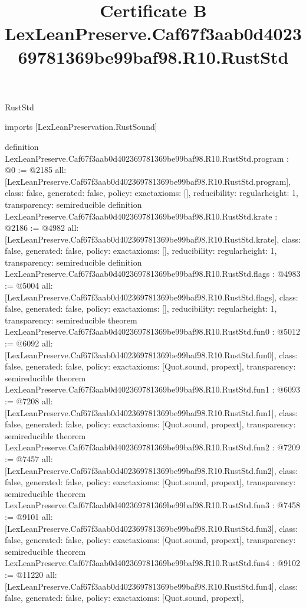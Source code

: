 \begin{lexlean}{RustStd}
\title{Certificate B LexLeanPreserve.Caf67f3aab0d402369781369be99baf98.R10.RustStd}
\begin{coremodule}
imports [LexLeanPreservation.RustSound]

definition LexLeanPreserve.Caf67f3aab0d402369781369be99baf98.R10.RustStd.program : @0 := @2185 {
  all: [LexLeanPreserve.Caf67f3aab0d402369781369be99baf98.R10.RustStd.program],
  class: false,
  generated: false,
  policy: exact{axioms: []},
  reducibility: regular{height: 1},
  transparency: semireducible
}
definition LexLeanPreserve.Caf67f3aab0d402369781369be99baf98.R10.RustStd.krate : @2186 := @4982 {
  all: [LexLeanPreserve.Caf67f3aab0d402369781369be99baf98.R10.RustStd.krate],
  class: false,
  generated: false,
  policy: exact{axioms: []},
  reducibility: regular{height: 1},
  transparency: semireducible
}
definition LexLeanPreserve.Caf67f3aab0d402369781369be99baf98.R10.RustStd.flags : @4983 := @5004 {
  all: [LexLeanPreserve.Caf67f3aab0d402369781369be99baf98.R10.RustStd.flags],
  class: false,
  generated: false,
  policy: exact{axioms: []},
  reducibility: regular{height: 1},
  transparency: semireducible
}
theorem LexLeanPreserve.Caf67f3aab0d402369781369be99baf98.R10.RustStd.fun0 : @5012 := @6092 {
  all: [LexLeanPreserve.Caf67f3aab0d402369781369be99baf98.R10.RustStd.fun0],
  class: false,
  generated: false,
  policy: exact{axioms: [Quot.sound, propext]},
  transparency: semireducible
}
theorem LexLeanPreserve.Caf67f3aab0d402369781369be99baf98.R10.RustStd.fun1 : @6093 := @7208 {
  all: [LexLeanPreserve.Caf67f3aab0d402369781369be99baf98.R10.RustStd.fun1],
  class: false,
  generated: false,
  policy: exact{axioms: [Quot.sound, propext]},
  transparency: semireducible
}
theorem LexLeanPreserve.Caf67f3aab0d402369781369be99baf98.R10.RustStd.fun2 : @7209 := @7457 {
  all: [LexLeanPreserve.Caf67f3aab0d402369781369be99baf98.R10.RustStd.fun2],
  class: false,
  generated: false,
  policy: exact{axioms: [Quot.sound, propext]},
  transparency: semireducible
}
theorem LexLeanPreserve.Caf67f3aab0d402369781369be99baf98.R10.RustStd.fun3 : @7458 := @9101 {
  all: [LexLeanPreserve.Caf67f3aab0d402369781369be99baf98.R10.RustStd.fun3],
  class: false,
  generated: false,
  policy: exact{axioms: [Quot.sound, propext]},
  transparency: semireducible
}
theorem LexLeanPreserve.Caf67f3aab0d402369781369be99baf98.R10.RustStd.fun4 : @9102 := @11220 {
  all: [LexLeanPreserve.Caf67f3aab0d402369781369be99baf98.R10.RustStd.fun4],
  class: false,
  generated: false,
  policy: exact{axioms: [Quot.sound, propext]},
}
\end{coremodule}
\end{lexlean}
